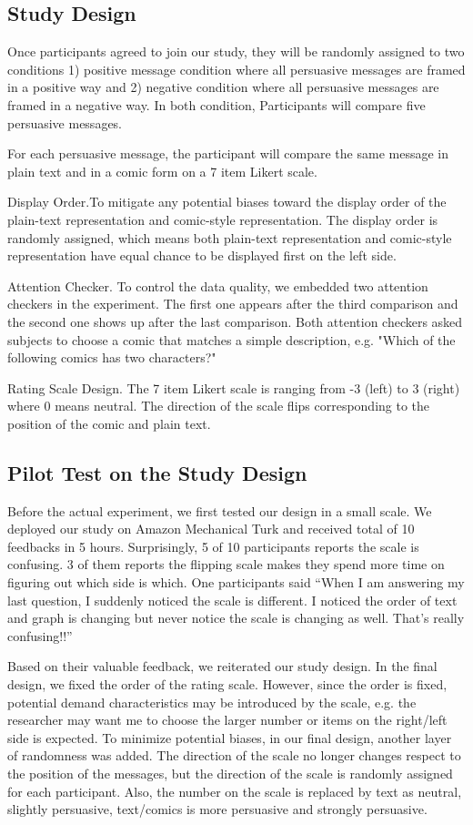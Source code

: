 \subsection{Study Design}
Once participants agreed to join our study, they will be randomly assigned to two conditions 1) positive message condition where all persuasive messages are framed in a positive way and 2) negative condition where all persuasive messages are framed in a negative way. In both condition, Participants will compare five persuasive messages.\par
For each persuasive message, the participant will compare the same message in plain text and in a comic form on a 7 item Likert scale. \par
Display Order.To mitigate any potential biases toward the display order of the plain-text representation and comic-style representation. The display order is randomly assigned, which means both plain-text representation and comic-style representation have equal chance to be displayed first on the left side.\par
Attention Checker. To control the data quality, we embedded two attention checkers in the experiment. The first one appears after the third comparison and the second one shows up after the last comparison. Both attention checkers asked subjects to choose a comic that matches a simple description, e.g. "Which of the following comics has two characters?"\par
Rating Scale Design. The 7 item Likert scale is ranging from -3 (left) to 3 (right) where 0 means neutral. The direction of the scale flips corresponding to the position of the comic and plain text. \par
\subsection{Pilot Test on the Study Design
}
Before the actual experiment, we first tested our design in a small scale. We deployed our study on Amazon Mechanical Turk and received total of 10 feedbacks in 5 hours. Surprisingly, 5 of 10 participants reports the scale is confusing. 3 of them reports the flipping scale makes they spend more time on figuring out which side is which. One participants said “When I am answering my last question, I suddenly noticed the scale is different. I noticed the order of text and graph is changing but never notice the scale is changing as well. That’s really confusing!!”\par
Based on their valuable feedback, we reiterated our study design. In the final design, we fixed the order of the rating scale. However, since the order is fixed, potential demand characteristics may be introduced by the scale, e.g. the researcher may want me to choose the larger number or items on the right/left side is expected. To minimize potential biases, in our final design, another layer of randomness was added.  The direction of the scale no longer changes respect to the position of the messages, but the direction of the scale is randomly assigned for each participant. Also, the number on the scale is replaced by text as neutral, slightly persuasive, text/comics is more persuasive and strongly persuasive.
